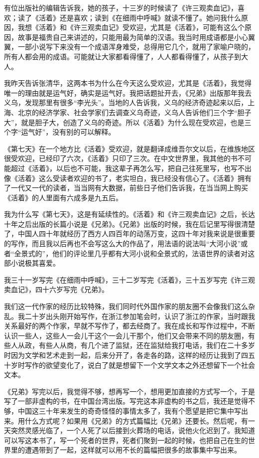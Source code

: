 \documentclass[fontset=fandol,12pt,a5paper]{ctexbook}
\begin{document}
有位出版社的编辑告诉我，她的孩子，十三岁的时候读了《许三观卖血记》，喜欢；读了《活着》还是喜欢；读到《在细雨中呼喊》就读不懂了。她问我什么原因，我想《活着》和《许三观卖血记》受欢迎，尤其是《活着》，可能有这么个原因，故事是福贵自己来讲述的，只能用最为简单的汉语。我当时用成语都是小心翼翼，一部小说写下来没有一个成语浑身难受，总得用它几个，就用了家喻户晓的，所有人都会用的成语。可能就让大家都看得懂了，人人都看得懂了，从孩子到大人。

我昨天告诉张清华，这两本书为什么在今天这么受欢迎，尤其是《活着》，我觉得唯一的理由就是运气好，确实是运气好。我把话题扯开去，《兄弟》出版那年我去义乌，发现那里有很多“李光头”。当地的人告诉我，义乌的经济奇迹起来以后，上海、北京的经济学家、社会学家们去调查义乌奇迹，义乌人告诉他们三个字“胆子大”，就是胆子大，创造了义乌的奇迹。所以《活着》为什么现在受欢迎，也是三个字“运气好”，没有别的可以解释。

《第七天》在一个地方比《活着》受欢迎，就是翻译成维吾尔文以后，在维族地区很受欢迎，已经印了六次，《活着》只印了三次。在中文世界里，我其他的书不可能超过《活着》，以后也不可能，我这辈子再怎么写，把自己往死里写，也写不出像《活着》这么受读者欢迎的书了，老实坦白，我已经没有信心了。《活着》拥有了一代又一代的读者，当当网有大数据，前些日子他们告诉我，在当当网上购买《活着》的人里面有六成多是九五后。

我为什么写《第七天》，这是有延续性的。《活着》和《许三观卖血记》之后，长达十年之后出版的长篇小说是《兄弟》。《兄弟》出版的时候，我在后记里写得很清楚了，中国人四十年就经历了西方人四百年的动荡万变，这四十年对我来说是很重要的写作，而且我以后再也不会写这么大的作品了，用法语的说法叫“大河小说”或者“全景式的”，他们的评论里几乎都有大河小说和全景式的，法语世界的读者对这部小说极其喜爱。

我三十一岁写完《在细雨中呼喊》，三十二岁写完《活着》，三十五岁写完《许三观卖血记》，四十六岁写完《兄弟》。

我们这一代作家的经历比较特殊，我们同时代外国作家的朋友圈不会像我们这么杂乱。我二十岁出头刚开始写作，在浙江参加笔会时，认识了浙江的作家，当时跟我关系最好的两个作家，早就不写作了，都去经商了。我在成长和写作过程中，不断认识一些人，这些人一会儿干这个一会儿干那个，他们又会带来不同的朋友圈，有些人从政，有些人从商，有几个进了监狱，还在监狱给我打电话，我们在二十多岁时因为文学和艺术走到一起，后来分开了，各走各的路，这样的经历让我到了四五十岁时写作的欲望变化了，说白了就是想留下一个文学文本之外还想留下一个社会文本。

《兄弟》写完以后，我觉得不够，想再写一个，想用更加直接的方式写一个，于是写了一部非虚构的书，在中国台湾出版。写完这本非虚构的书之后，我还是觉得不够，中国这三十年来发生的奇奇怪怪的事情太多了，我有个愿望是把它集中写出来。用什么方式呢？如果用《兄弟》的方式篇幅比《兄弟》还要长。然后呢，有一天突然灵感光临了，一个人死了以后接到火葬场的电话，说他火化迟到了。我知道可以写这本书了，写一个死者的世界，死者们聚到一起的时候，也把自己在生的世界里的遭遇带到了一起，这样就可以用不长的篇幅把很多的故事集中写出来。
\end{document}
